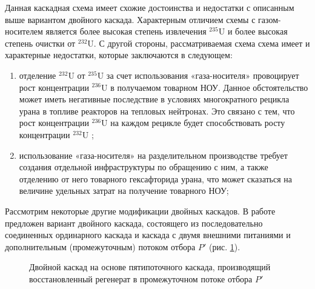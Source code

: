 Данная каскадная схема имеет схожие достоинства и недостатки с описанным выше вариантом двойного каскада. Характерным отличием схемы с газом-носителем является более высокая степень извлечения  $^{235}$U и более высокая степень очистки от $^{232}$U. С другой стороны, рассматриваемая схема схема имеет и характерные недостатки, которые заключаются в следующем:
\begin{enumerate}
  \item	отделение $^{232}$U от $^{235}$U за счет использования «газа-носителя» провоцирует рост концентрации $^{236}$U в получаемом товарном НОУ. Данное обстоятельство может иметь негативные последствие в условиях многократного рецикла урана в топливе реакторов на тепловых нейтронах. Это связано с тем, что рост концентрации $^{236}$U на каждом рецикле будет способствовать росту концентрации $^{232}$U \cite{smirnovEvolutionIsotopicComposition2012};
  \item	использование «газа-носителя» на разделительном производстве требует создания отдельной инфраструктуры по обращению с ним, а также отделению от него товарного гексафторида урана, что может сказаться на величине удельных затрат на получение товарного НОУ;
\end{enumerate}

Рассмотрим некоторые другие модификации двойных каскадов. В работе \cite{SposobIzotopnogoVosstanovleniyac} предложен вариант двойного каскада, состоящего из последовательно соединенных ординарного каскада и каскада с двумя внешними питаниями и дополнительным (промежуточным) потоком отбора $P'$ (рис. \ref{fig:double_crazy}).

\begin{figure}[ht]
  \caption{Двойной каскад на основе пятипоточного каскада, производящий восстановленный регенерат в промежуточном потоке отбора $P'$}\label{fig:double_crazy}
\end{figure}

